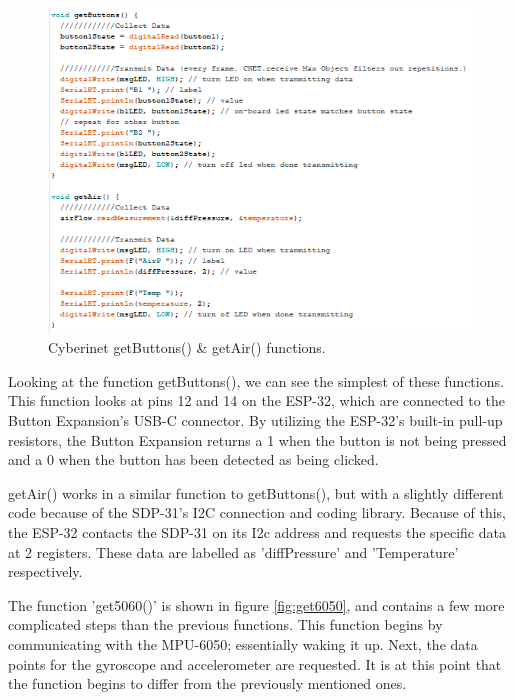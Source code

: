 \begin{center}
    \begin{figure}
        \centering
        \includegraphics[scale=1.5]{diagrams/maxPatches/getbuttonsgetair.png}
        \caption{Cyberinet getButtons() \& getAir() functions.}
        \label{fig:getButtonsGetAir}
    \end{figure}
\end{center}

Looking at the function getButtons(), we can see the simplest of these functions. This function looks at pins 12 and 14 on the ESP-32, which are connected to the Button Expansion's USB-C connector. By utilizing the ESP-32's built-in pull-up resistors, the Button Expansion returns a 1 when the button is not being pressed and a 0 when the button has been detected as being clicked.

getAir() works in a similar function to getButtons(), but with a slightly different code because of the SDP-31's I2C connection and coding library. Because of this, the ESP-32 contacts the SDP-31 on its I2c address and requests the specific data at 2 registers. These data are labelled as 'diffPressure' and 'Temperature' respectively. 

The function 'get5060()' is shown in figure \ref{fig:get6050}, and contains a few more complicated steps than the previous functions. This function begins by communicating with the MPU-6050; essentially waking it up. Next, the data points for the gyroscope and accelerometer are requested. It is at this point that the function begins to differ from the previously mentioned ones.

